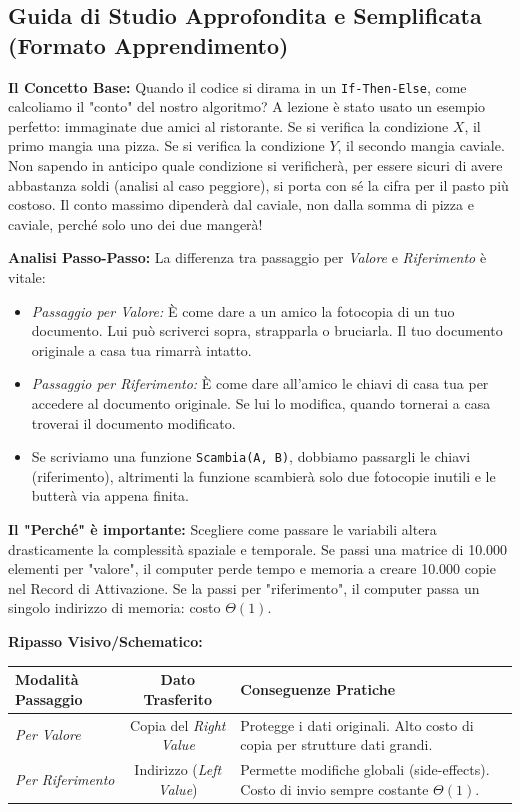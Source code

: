 \documentclass[a4paper, 11pt]{report}
\begin{document}
\vspace{0.5cm}
\subsection*{Guida di Studio Approfondita e Semplificata (Formato Apprendimento)}


\textbf{Il Concetto Base:}
Quando il codice si dirama in un \texttt{If-Then-Else}, come calcoliamo il "conto" del nostro algoritmo? A lezione è stato usato un esempio perfetto: immaginate due amici al ristorante. Se si verifica la condizione $X$, il primo mangia una pizza. Se si verifica la condizione $Y$, il secondo mangia caviale. Non sapendo in anticipo quale condizione si verificherà, per essere sicuri di avere abbastanza soldi (analisi al caso peggiore), si porta con sé la cifra per il pasto più costoso. Il conto massimo dipenderà dal caviale, non dalla somma di pizza e caviale, perché solo uno dei due mangerà!

\textbf{Analisi Passo-Passo:}
La differenza tra passaggio per \textit{Valore} e \textit{Riferimento} è vitale:
\begin{itemize}
\item \textit{Passaggio per Valore:} È come dare a un amico la fotocopia di un tuo documento. Lui può scriverci sopra, strapparla o bruciarla. Il tuo documento originale a casa tua rimarrà intatto.
\item \textit{Passaggio per Riferimento:} È come dare all'amico le chiavi di casa tua per accedere al documento originale. Se lui lo modifica, quando tornerai a casa troverai il documento modificato.
\item Se scriviamo una funzione \texttt{Scambia(A, B)}, dobbiamo passargli le chiavi (riferimento), altrimenti la funzione scambierà solo due fotocopie inutili e le butterà via appena finita.
\end{itemize}

\textbf{Il "Perché" è importante:}
Scegliere come passare le variabili altera drasticamente la complessità spaziale e temporale. Se passi una matrice di 10.000 elementi per "valore", il computer perde tempo e memoria a creare 10.000 copie nel Record di Attivazione. Se la passi per "riferimento", il computer passa un singolo indirizzo di memoria: costo $\Theta(1)$.

\textbf{Ripasso Visivo/Schematico:}
\begin{center}
\begin{tabular}{|l|c|p{7cm}|}
\hline
\textbf{Modalità Passaggio} & \textbf{Dato Trasferito} & \textbf{Conseguenze Pratiche} \\
\hline
\textit{Per Valore} & Copia del \textit{Right Value} & Protegge i dati originali. Alto costo di copia per strutture dati grandi. \\
\hline
\textit{Per Riferimento} & Indirizzo (\textit{Left Value}) & Permette modifiche globali (side-effects). Costo di invio sempre costante $\Theta(1)$. \\
\hline
\end{tabular}
\end{center}
\end{document}

